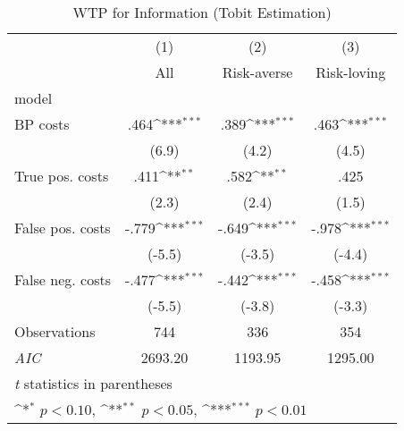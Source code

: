 \begin{table}[htbp]\centering
\def\sym#1{\ifmmode^{#1}\else\(^{#1}\)\fi}
\caption{WTP for Information (Tobit Estimation)}
\begin{tabular}{l*{3}{c}}
\hline\hline
                &\multicolumn{1}{c}{(1)}&\multicolumn{1}{c}{(2)}&\multicolumn{1}{c}{(3)}\\
                &\multicolumn{1}{c}{All}&\multicolumn{1}{c}{Risk-averse}&\multicolumn{1}{c}{Risk-loving}\\
\hline
model           &                  &                  &                  \\
BP costs        &     .464\sym{***}&     .389\sym{***}&     .463\sym{***}\\
                &    (6.9)         &    (4.2)         &    (4.5)         \\
True pos. costs &     .411\sym{**} &     .582\sym{**} &     .425         \\
                &    (2.3)         &    (2.4)         &    (1.5)         \\
False pos. costs&    -.779\sym{***}&    -.649\sym{***}&    -.978\sym{***}\\
                &   (-5.5)         &   (-3.5)         &   (-4.4)         \\
False neg. costs&    -.477\sym{***}&    -.442\sym{***}&    -.458\sym{***}\\
                &   (-5.5)         &   (-3.8)         &   (-3.3)         \\
\hline
Observations    &      744         &      336         &      354         \\
\textit{AIC}    &  2693.20         &  1193.95         &  1295.00         \\
\hline\hline
\multicolumn{4}{l}{\footnotesize \textit{t} statistics in parentheses}\\
\multicolumn{4}{l}{\footnotesize \sym{*} \(p<0.10\), \sym{**} \(p<0.05\), \sym{***} \(p<0.01\)}\\
\end{tabular}
\end{table}
